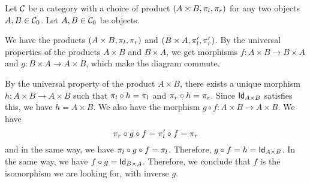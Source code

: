 \begin{solution}\label{sol:swap_binary_product}
  Let $\CC$ be a category with a choice of product $(A\times B, \projl, \projr)$ for any two objects $A,B\in \Ob{\CC}$. Let $A, B \in \Ob\CC$ be objects.

	\begin{center}
	\end{center}

	We have the products $ (A \times B, \projl, \projr) $ and $ (B \times A, \projl^\prime, \projr^\prime) $. By the universal properties of the products $ A \times B $ and $ B \times A $, we get morphisms $ f: A \times B \to B \times A $ and $ g: B \times A \to A \times B $, which make the diagram commute.
	
	By the universal property of the product $ A \times B $, there exists a unique morphism $ h: A \times B \to A \times B $ such that $ \projl \circ h = \projl $ and $ \projr \circ h = \projr $. Since $ \Id[A \times B] $ satisfies this, we have $ h = A \times B $. We also have the morphism $ g \circ f: A \times B \to A \times B $. We have
	\[ \projr \circ g \circ f = \projl^\prime \circ f = \projr \]
	and in the same way, we have $ \projl \circ g \circ f = \projl $. Therefore, $ g \circ f = h = \Id[A \times B] $. In the same way, we have $ f \circ g = \Id[B \times A] $. Therefore, we conclude that $ f $ is the isomorphism we are looking for, with inverse $ g $.
\end{solution}

